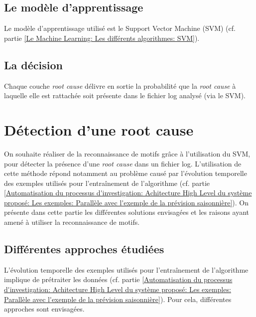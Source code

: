 \subsection{Le modèle d'apprentissage}
\label{Automatisation du processus d'investigation: Achitecture High Level du système proposé: Le modèle d'apprentissage}
Le modèle d'apprentissage utilisé est le Support Vector Machine (SVM) (cf. partie \ref{Le Machine Learning: Les différents algorithmes: SVM}).


\subsection{La décision}
\label{Automatisation du processus d'investigation: Achitecture High Level du système proposé: La décision}
Chaque couche \emph{root cause} délivre en sortie la probabilité que la \emph{root cause} à laquelle elle est rattachée soit présente dans le fichier log analysé (via le SVM).



\section{Détection d'une root cause}
\label{Automatisation du processus d'investigation: Détection d'une root cause}
On souhaite réaliser de la reconnaissance de motifs grâce à l'utilisation du SVM, pour détecter la présence d'une \emph{root cause} dans un fichier log. L'utilisation de cette méthode répond notamment au problème causé par l'évolution temporelle des exemples utilisés pour l'entraînement de l'algorithme (cf. partie \ref{Automatisation du processus d'investigation: Achitecture High Level du système proposé: Les exemples: Parallèle avec l'exemple de la prévision saisonnière}). On présente dans cette partie les différentes solutions envisagées et les raisons ayant amené à utiliser la reconnaissance de motifs. \\

\subsection{Différentes approches étudiées}
\label{Automatisation du processus d'investigation: Reconnaissance de motifs: Différentes approches étudiées}
L'évolution temporelle des exemples utilisés pour l'entraînement de l'algorithme implique de prétraiter les données (cf. partie \ref{Automatisation du processus d'investigation: Achitecture High Level du système proposé: Les exemples: Parallèle avec l'exemple de la prévision saisonnière}). Pour cela, différentes approches sont envisagées.

